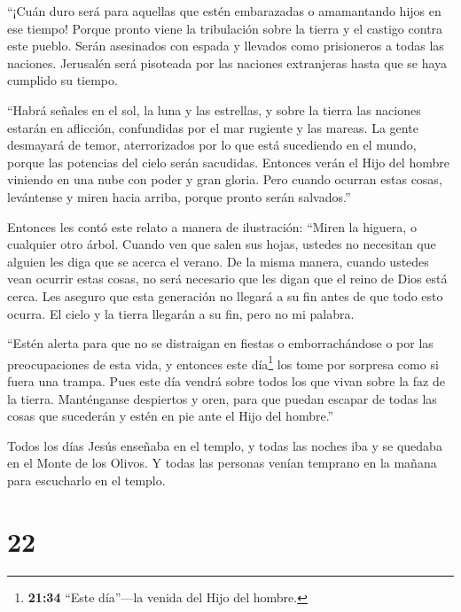  ``¡Cuán duro será para aquellas que estén embarazadas o
amamantando hijos en ese tiempo! Porque pronto viene la tribulación
sobre la tierra y el castigo contra este pueblo.  Serán
asesinados con espada y llevados como prisioneros a todas las naciones.
Jerusalén será pisoteada por las naciones extranjeras hasta que se haya
cumplido su tiempo.

 ``Habrá señales en el sol, la luna y las estrellas, y
sobre la tierra las naciones estarán en aflicción, confundidas por el
mar rugiente y las mareas.  La gente desmayará de temor,
aterrorizados por lo que está sucediendo en el mundo, porque las
potencias del cielo serán sacudidas.  Entonces verán el
Hijo del hombre viniendo en una nube con poder y gran gloria.
 Pero cuando ocurran estas cosas, levántense y miren hacia
arriba, porque pronto serán salvados.''

 Entonces les contó este relato a manera de ilustración:
``Miren la higuera, o cualquier otro árbol.  Cuando ven que
salen sus hojas, ustedes no necesitan que alguien les diga que se acerca
el verano.  De la misma manera, cuando ustedes vean ocurrir
estas cosas, no será necesario que les digan que el reino de Dios está
cerca.  Les aseguro que esta generación no llegará a su fin
antes de que todo esto ocurra.  El cielo y la tierra
llegarán a su fin, pero no mi palabra.

 ``Estén alerta para que no se distraigan en fiestas o
emborrachándose o por las preocupaciones de esta vida, y entonces este
día\footnote{\textbf{21:34} ``Este día''---la venida del Hijo del
  hombre.} los tome por sorpresa como si fuera una trampa. 
Pues este día vendrá sobre todos los que vivan sobre la faz de la
tierra.  Manténganse despiertos y oren, para que puedan
escapar de todas las cosas que sucederán y estén en pie ante el Hijo del
hombre.''

 Todos los días Jesús enseñaba en el templo, y todas las
noches iba y se quedaba en el Monte de los Olivos.  Y todas
las personas venían temprano en la mañana para escucharlo en el templo.

\hypertarget{section-21}{%
\section{22}\label{section-21}}

